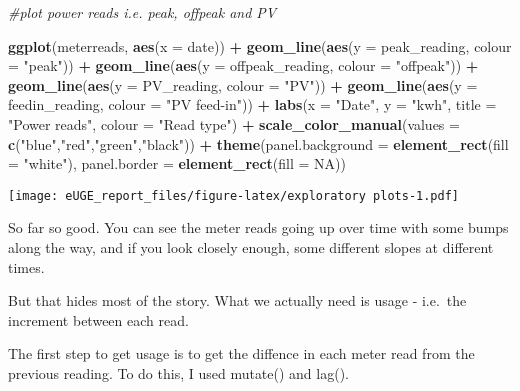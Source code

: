 \documentclass[]{article}
\newenvironment{Shaded}{\begin{snugshade}}{\end{snugshade}}
\newcommand{\KeywordTok}[1]{\textcolor[rgb]{0.13,0.29,0.53}{\textbf{#1}}}
\newcommand{\DataTypeTok}[1]{\textcolor[rgb]{0.13,0.29,0.53}{#1}}
\newcommand{\StringTok}[1]{\textcolor[rgb]{0.31,0.60,0.02}{#1}}
\newcommand{\CommentTok}[1]{\textcolor[rgb]{0.56,0.35,0.01}{\textit{#1}}}
\newcommand{\OtherTok}[1]{\textcolor[rgb]{0.56,0.35,0.01}{#1}}
\newcommand{\OperatorTok}[1]{\textcolor[rgb]{0.81,0.36,0.00}{\textbf{#1}}}
\newcommand{\NormalTok}[1]{#1}
\begin{document}
\begin{Shaded}
\begin{Highlighting}[]
\CommentTok{#plot power reads i.e. peak, offpeak and PV}

\KeywordTok{ggplot}\NormalTok{(meterreads, }\KeywordTok{aes}\NormalTok{(}\DataTypeTok{x =}\NormalTok{ date)) }\OperatorTok{+}\StringTok{ }
\StringTok{  }\KeywordTok{geom_line}\NormalTok{(}\KeywordTok{aes}\NormalTok{(}\DataTypeTok{y =}\NormalTok{ peak_reading, }\DataTypeTok{colour =} \StringTok{"peak"}\NormalTok{)) }\OperatorTok{+}
\StringTok{  }\KeywordTok{geom_line}\NormalTok{(}\KeywordTok{aes}\NormalTok{(}\DataTypeTok{y =}\NormalTok{ offpeak_reading, }\DataTypeTok{colour =} \StringTok{"offpeak"}\NormalTok{)) }\OperatorTok{+}
\StringTok{  }\KeywordTok{geom_line}\NormalTok{(}\KeywordTok{aes}\NormalTok{(}\DataTypeTok{y =}\NormalTok{ PV_reading, }\DataTypeTok{colour =} \StringTok{"PV"}\NormalTok{)) }\OperatorTok{+}
\StringTok{  }\KeywordTok{geom_line}\NormalTok{(}\KeywordTok{aes}\NormalTok{(}\DataTypeTok{y =}\NormalTok{ feedin_reading, }\DataTypeTok{colour =} \StringTok{"PV feed-in"}\NormalTok{)) }\OperatorTok{+}
\StringTok{  }\KeywordTok{labs}\NormalTok{(}\DataTypeTok{x =} \StringTok{"Date"}\NormalTok{, }\DataTypeTok{y =} \StringTok{"kwh"}\NormalTok{, }\DataTypeTok{title =} \StringTok{"Power reads"}\NormalTok{, }\DataTypeTok{colour =} \StringTok{"Read type"}\NormalTok{) }\OperatorTok{+}
\StringTok{  }\KeywordTok{scale_color_manual}\NormalTok{(}\DataTypeTok{values =} \KeywordTok{c}\NormalTok{(}\StringTok{"blue"}\NormalTok{,}\StringTok{"red"}\NormalTok{,}\StringTok{"green"}\NormalTok{,}\StringTok{"black"}\NormalTok{)) }\OperatorTok{+}
\StringTok{  }\KeywordTok{theme}\NormalTok{(}\DataTypeTok{panel.background =} \KeywordTok{element_rect}\NormalTok{(}\DataTypeTok{fill =} \StringTok{"white"}\NormalTok{),}
        \DataTypeTok{panel.border =} \KeywordTok{element_rect}\NormalTok{(}\DataTypeTok{fill =} \OtherTok{NA}\NormalTok{))}
\end{Highlighting}
\end{Shaded}

\texttt{[image: eUGE\_report\_files/figure-latex/exploratory plots-1.pdf]}

So far so good. You can see the meter reads going up over time with some
bumps along the way, and if you look closely enough, some different
slopes at different times.

But that hides most of the story. What we actually need is usage -
i.e.~the increment between each read.

The first step to get usage is to get the diffence in each meter read
from the previous reading. To do this, I used mutate() and lag().
\end{document}
